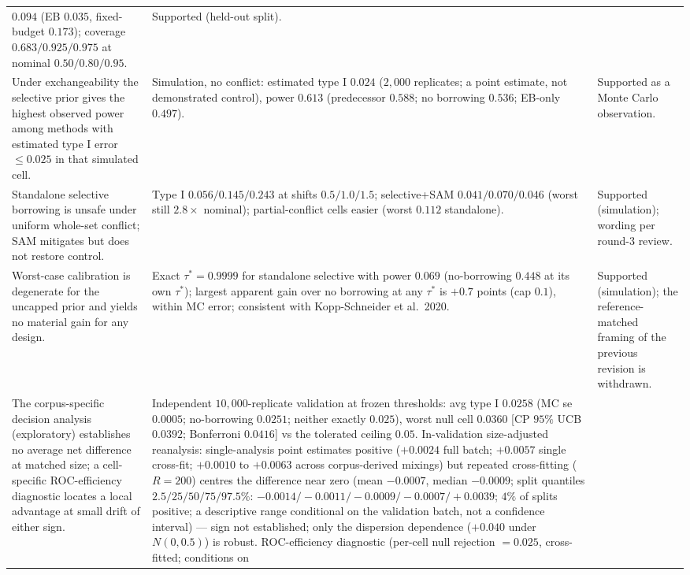 \documentclass[11pt]{article}
\begin{document}
\begin{longtable}{p{} p{} p{}}
$0.094$ (EB $0.035$, fixed-budget $0.173$); coverage $0.683/0.925/0.975$ at
nominal $0.50/0.80/0.95$. & Supported (held-out split). \\
Under exchangeability the selective prior gives the highest observed power
among methods with estimated type I error $\le 0.025$ in that simulated
cell. & Simulation, no conflict: estimated type I $0.024$ ($2{,}000$
replicates; a point estimate, not demonstrated control), power
$0.613$ (predecessor $0.588$; no borrowing $0.536$; EB-only $0.497$). &
Supported as a Monte Carlo observation. \\
Standalone selective borrowing is unsafe under uniform whole-set conflict;
SAM mitigates but does not restore control. & Type I $0.056/0.145/0.243$ at
shifts $0.5/1.0/1.5$; selective+SAM $0.041/0.070/0.046$ (worst still
$2.8\times$ nominal); partial-conflict cells easier (worst $0.112$
standalone). & Supported (simulation); wording per round-3 review. \\
Worst-case calibration is degenerate for the uncapped prior and yields no
material gain for any design. & Exact $\tau^{*}=0.9999$ for standalone
selective with power $0.069$ (no-borrowing $0.448$ at its own $\tau^{*}$);
largest apparent gain over no borrowing at any $\tau^{*}$ is $+0.7$ points
(cap $0.1$), within MC error; consistent with Kopp-Schneider et al.\ 2020.
& Supported (simulation); the reference-matched framing of the previous
revision is withdrawn. \\
The corpus-specific decision analysis (exploratory) establishes no
average net difference at matched size; a cell-specific ROC-efficiency
diagnostic locates a local advantage at small drift of either sign. &
Independent $10{,}000$-replicate validation at frozen thresholds: avg type
I $0.0258$ (MC se $0.0005$; no-borrowing $0.0251$; neither exactly
$0.025$), worst null cell $0.0360$ [CP $95\%$ UCB $0.0392$; Bonferroni
$0.0416$] vs the tolerated ceiling $0.05$. In-validation size-adjusted
reanalysis: single-analysis point estimates positive ($+0.0024$ full
batch; $+0.0057$ single cross-fit; $+0.0010$ to $+0.0063$ across
corpus-derived mixings) but repeated cross-fitting ($R=200$) centres the
difference near zero (mean $-0.0007$, median $-0.0009$; split quantiles
$2.5/25/50/75/97.5\%$: $-0.0014/-0.0011/-0.0009/-0.0007/+0.0039$; $4\%$
of splits positive; a descriptive range conditional on the validation
batch, not a confidence interval) --- sign not established; only the
dispersion
dependence ($+0.040$ under $N(0,0.5)$) is robust. ROC-efficiency
diagnostic (per-cell null rejection $=0.025$, cross-fitted; conditions on

\end{longtable}
\end{document}
